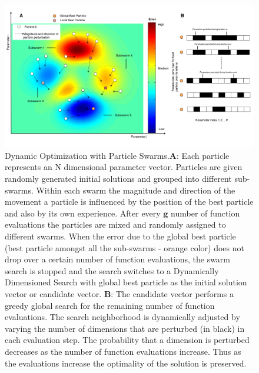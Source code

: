 \documentclass[12pt]{article}
\begin{document}
\begin{figure}[h]
\centering
\includegraphics[width=1.0\textwidth,height=0.5\textheight]{./figs/Figure_1_Algorithm.pdf}
\caption{Dynamic Optimization with Particle Swarms.\textbf{A}: Each particle represents an N dimensional parameter vector. Particles are given randomly generated initial solutions and grouped into different sub-swarms. Within each swarm the magnitude and direction of the movement a particle is influenced by the position of the best particle and also by its own experience. After every $\mathbf{g}$ number of function evaluations the particles are mixed and randomly assigned to different swarms. When the error due to the global best particle (best particle amongst all the sub-swarms - orange color) does not drop over a certain number of function evaluations, the swarm search is stopped and the search switches to a Dynamically Dimensioned Search with global best particle as the initial solution vector or candidate vector.
\textbf{B}: The candidate vector performs a greedy global search for the remaining number of function evaluations. The search neighborhood is dynamically adjusted by varying the number of dimensions that are perturbed (in black) in each evaluation step. The probability that a dimension is perturbed decreases as the number of function evaluations increase. Thus as the evaluations increase the optimality of the solution is preserved.
}\label{fig-algorithm}
\end{figure}

\clearpage
\end{document}
